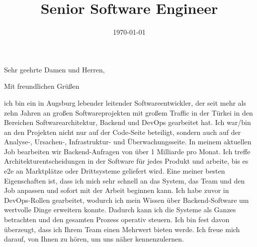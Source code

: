 \documentclass[11pt,a4paper,sans]{moderncv}
\title{Senior Software Engineer}
\begin{document}
\recipient{}{}
\date{\today}
\opening{Sehr geehrte Damen und Herren,}
\closing{Mit freundlichen Gr\"u\ss{}en}
\makelettertitle

ich bin ein in Augsburg lebender leitender Softwareentwickler, der seit mehr als zehn Jahren an gro\ss{}en Softwareprojekten mit gro\ss{}em Traffic in der T\"urkei in den Bereichen Softwarearchitektur, Backend und DevOps gearbeitet hat. Ich war/bin an den Projekten nicht nur auf der Code-Seite beteiligt, sondern auch auf der Analyse-, Ursachen-, Infrastruktur- und \"Uberwachungsseite. In meinem aktuellen Job bearbeiten wir Backend-Anfragen von \"uber 1 Milliarde pro Monat. Ich treffe Architekturentscheidungen in der Software f\"ur jedes Produkt und arbeite, bis es e2e an Marktpl\"atze oder Drittsysteme geliefert wird. Eine meiner besten Eigenschaften ist, dass ich mich sehr schnell an das System, das Team und den Job anpassen und sofort mit der Arbeit beginnen kann. Ich habe zuvor in DevOps-Rollen gearbeitet, wodurch ich mein Wissen \"uber Backend-Software um wertvolle Dinge erweitern konnte. Dadurch kann ich die Systeme als Ganzes betrachten und den gesamten Prozess operativ steuern. Ich bin fest davon \"uberzeugt, dass ich Ihrem Team einen Mehrwert bieten werde. Ich freue mich darauf, von Ihnen zu h\"oren, um uns n\"aher kennenzulernen.

\makeletterclosing
\end{document}
